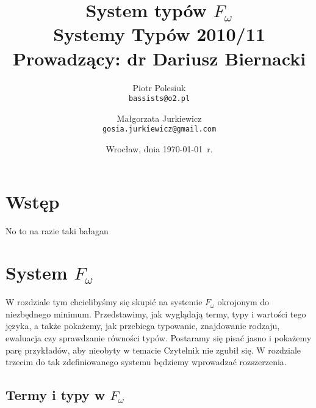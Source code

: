 \documentclass[11pt,leqno]{article}
\title{{\textbf{System typów $F_{\omega}$}}\\[1ex]
       {\Large Systemy Typów 2010/11}\\[-1ex]
       {\large Prowadzący: dr Dariusz Biernacki}}
\author{Piotr Polesiuk \\ \texttt{bassists@o2.pl} 
   \and Małgorzata Jurkiewicz \\ \texttt{gosia.jurkiewicz@gmail.com}}
\date{Wrocław, dnia \today\ r.}
\begin{document}
\thispagestyle{empty}
\maketitle

\pagebreak

\theoremstyle{plain}
\newtheorem{twierdzenie}{Twierdzenie}
\newtheorem{lemat}{Lemat}
\newtheorem{fakt}{Fakt}

\theoremstyle{definition}
\newtheorem{definicja}{Definicja}



\section{Wstęp}
\setcounter{equation}{0}


No to na razie taki bałagan



\section{System $F_{\omega}$}                                 
\setcounter{equation}{0}

W rozdziale tym chcielibyśmy się skupić na systemie $F_{\omega}$ okrojonym do niezbędnego minimum.
Przedstawimy, jak wyglądają termy, typy i wartości tego języka, a także pokażemy, jak przebiega typowanie,
znajdowanie rodzaju, ewaluacja czy sprawdzanie równości typów. Postaramy się pisać jasno i pokażemy parę przykładów, 
aby nieobyty w temacie Czytelnik nie zgubił się.  W rozdziale trzecim do tak zdefiniowanego systemu będziemy wprowadzać
rozszerzenia.

\subsection {Termy i typy w $F_\omega$}
\end{document}
